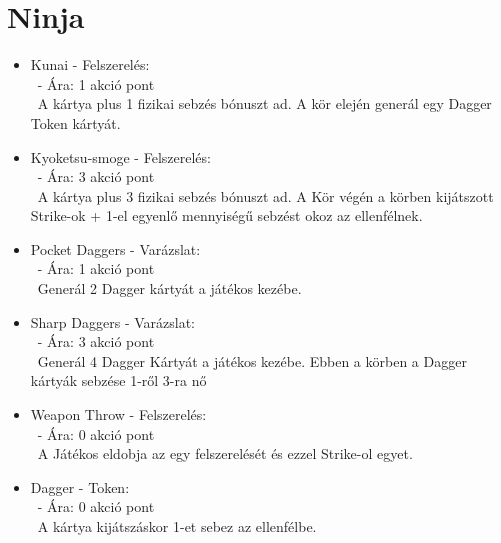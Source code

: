 \section{Ninja}
\begin{itemize}
    \item Kunai - Felszerelés:\\\
    - Ára: 1 akció pont \\\
    A kártya plus 1 fizikai sebzés bónuszt ad. A kör elején generál egy Dagger Token kártyát.
    \item Kyoketsu-smoge - Felszerelés:\\\
    - Ára: 3 akció pont \\\
     A kártya plus 3 fizikai sebzés bónuszt ad. A Kör végén a körben kijátszott 
     Strike-ok + 1-el egyenlő mennyiségű sebzést okoz az ellenfélnek.
    \item Pocket Daggers - Varázslat:\\\
    - Ára: 1 akció pont \\\
    Generál 2 Dagger kártyát a játékos kezébe.
    \item Sharp Daggers - Varázslat:\\\
    - Ára: 3 akció pont \\\
    Generál 4 Dagger Kártyát a játékos kezébe. Ebben a körben a Dagger kártyák sebzése 1-ről 3-ra nő
    \item Weapon Throw - Felszerelés:\\\
    - Ára: 0 akció pont \\\
    A Játékos eldobja az egy felszerelését és ezzel Strike-ol egyet.
    \item Dagger - Token:\\\
    - Ára: 0 akció pont \\\
    A kártya kijátszáskor 1-et sebez az ellenfélbe.
\end{itemize}

